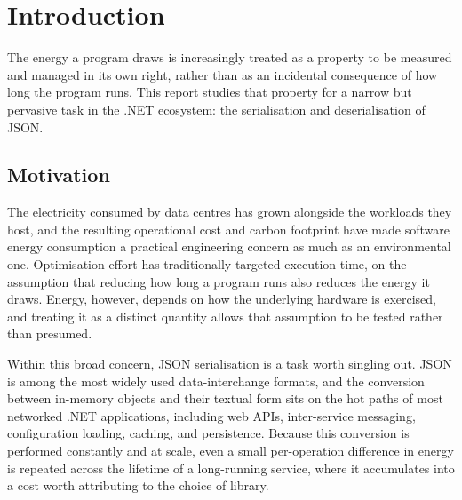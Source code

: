 %

\chapter{Introduction}
\label{chap:Introduction}

The energy a program draws is increasingly treated as a property to be
measured and managed in its own right, rather than as an incidental
consequence of how long the program runs. This report studies that property
for a narrow but pervasive task in the .NET ecosystem: the serialisation and
deserialisation of JSON.

\section{Motivation}
\label{sec:intro-motivation}

The electricity consumed by data centres has grown alongside the workloads
they host, and the resulting operational cost and carbon footprint have made
software energy consumption a practical engineering concern as much as an
environmental one. %
Optimisation effort has traditionally targeted execution time, on the
assumption that reducing how long a program runs also reduces the energy it
draws. Energy, however, depends on how the underlying hardware is exercised,
and treating it as a distinct quantity allows that assumption to be tested
rather than presumed.

Within this broad concern, JSON serialisation is a task worth singling out.
JSON is among the most widely used data-interchange formats, and the
conversion between in-memory objects and their textual form sits on the hot
paths of most networked .NET applications, including web APIs, inter-service
messaging, configuration loading, caching, and persistence. %
Because this conversion is performed constantly and at scale, even a small
per-operation difference in energy is repeated across the lifetime of a
long-running service, where it accumulates into a cost worth attributing to
the choice of library.

